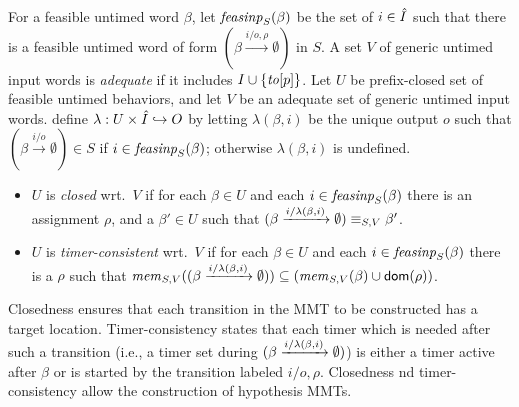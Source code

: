 For a feasible untimed word $\beta$, let $\feasibleinputs{\beta}{S}$ be the
set of $i \in \extinputs$ such that there is a feasible
untimed word of form $(\beta \xrightarrow{i/o,\rho} \emptyset)$ in $S$.
A set $V$ of generic untimed input words is {\em adequate} if it includes
$I \cup \set{\toevent{p}}$.
Let $U$ be prefix-closed set of feasible untimed behaviors,
and let $V$ be an adequate set of generic untimed input words.
define $\lambda:  U \times \extinputs \hookrightarrow O$ by
letting $\lambda(\beta,i)$ be the unique 
output $o$ such that $(\beta \xrightarrow{i/o} \emptyset) \in S$ if
$i \in \feasibleinputs{\beta}{S}$; otherwise $\lambda(\beta,i)$ is undefined. 
\begin{itemize}
\item
$U$ is {\em closed} wrt.\ $V$ if 
  for each $\beta \in U$ and each
  $i \in \feasibleinputs{\beta}{S}$
  there is an assignment $\rho$, and a $\beta' \in U$ such that
  $\extend{\beta}{i}{\lambda(\beta,i)} \equiv_{S,V} \beta'$.
\item
$U$ is {\em timer-consistent} wrt.\ $V$ if 
  for each $\beta \in U$ and each
  $i \in \feasibleinputs{\beta}{S}$
  there is a $\rho$  such that
  $\getmemorable{S}{\extend{\beta}{i}{\lambda(\beta,i)}}{V} \subseteq
  (\getmemorable{S}{\beta}{V} \cup \domof{\rho})$.
\end{itemize}
Closedness ensures that each transition in the MMT to be constructed has a target location. 
Timer-consistency states that each timer which is needed after such
a transition (i.e., a timer set during $\extend{\beta}{i}{\lambda(\beta,i)}$)
is either a timer active after $\beta$ or is started by the transition
labeled $i/o,\rho$. 
Closedness nd timer-consistency allow the construction of hypothesis MMTs.

